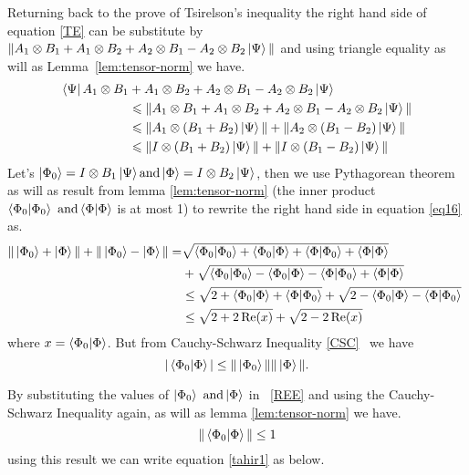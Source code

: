 Returning back to the prove of  Tsirelson’s inequality the right hand side of equation \ref{TE}  can be substitute by $\| A_1\otimes B_1+ A_1\otimes B_2+A_2\otimes B_1 -A_2\otimes B_2\ket{\Psi}\|$ and  using   triangle equality as will as Lemma~\ref{lem:tensor-norm} we have.
\begin{align}
\bra{\Psi}A_1\otimes B_1 &+ A_1\otimes B_2+A_2\otimes B_1 -A_2\otimes B_2\ket{\Psi} \\
&\leqslant  \| A_1\otimes B_1+ A_1\otimes B_2+A_2\otimes B_1 -A_2\otimes B_2\ket{\Psi}\| \nonumber\\
&\leqslant \| A_1\otimes (B_1+ B_2)\ket{\Psi}\| +\| A_2\otimes( B_1 - B_2)\ket{\Psi}\|\nonumber \\
&\leqslant \| I\otimes (B_1+ B_2)\ket{\Psi}\| +\| I\otimes( B_1 - B_2)\ket{\Psi}\|\label{eq16}
\end{align}
Let's $\ket{\Phi_0}=I\otimes B_1\ket{\Psi} \text{and}\ket{\Phi}=I\otimes B_2\ket{\Psi}$, then we  use  Pythagorean theorem as will as result from lemma \ref{lem:tensor-norm} (the inner product $\bra{\Phi_0}\ket{\Phi_0} \text{ and}\bra{\Phi}\ket{\Phi}$  is at most 1) to  rewrite the right hand side in equation \ref{eq16} as.
\begin{align}
\| \ket{\Phi_0}+ \ket{\Phi}\| +\| \ket{\Phi_0}- \ket{\Phi}\| = &\sqrt{\bra{\Phi_0}\ket{\Phi_0}+\bra{\Phi_0}\ket{\Phi}+\bra{\Phi}\ket{\Phi_0}+\bra{\Phi}\ket{\Phi}}\nonumber\\
&+\sqrt{\bra{\Phi_0}\ket{\Phi_0}-\bra{\Phi_0}\ket{\Phi}-\bra{\Phi}\ket{\Phi_0}+\bra{\Phi}\ket{\Phi}}\nonumber\\
 &\leq \sqrt{2+\bra{\Phi_0}\ket{\Phi}+\bra{\Phi}\ket{\Phi_0}}+\sqrt{2-\bra{\Phi_0}\ket{\Phi}-\bra{\Phi}\ket{\Phi_0}}\
\nonumber\\
&\leq \sqrt{2+2\Re(x)}+\sqrt{2-2\Re(x)}\label{tahir1}
\end{align} 
where $x= \bra{\Phi_0}\ket{\Phi}$. But from  Cauchy-Schwarz Inequality \ref{CSC}~ we have 
\begin{equation}\label{REE}
|\bra{\Phi_0}\ket{\Phi}|\leq \|\ket{\Phi_0}\|\|\ket{\Phi}\|.
\end{equation}


By substituting the values of $\ket{\Phi_0} \text{ and} \ket{\Phi}$ in ~\ref{REE} and using the Cauchy-Schwarz Inequality again, as will as lemma \ref{lem:tensor-norm} we have.
\begin{equation}
\|\bra{\Phi_0}\ket{\Phi}\|\leq 1
\end{equation}
using this result we can write equation \ref{tahir1} as below.

